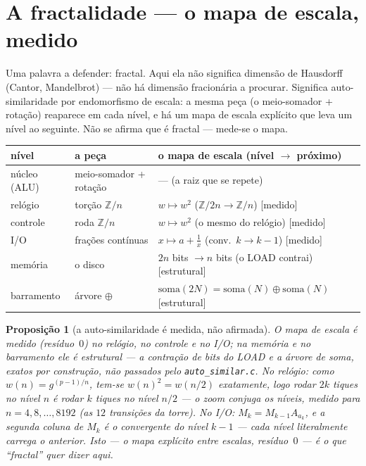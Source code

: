 \documentclass[11pt,a4paper]{article}
\newtheorem{proposicao}{Proposição}
\begin{document}
\section{A fractalidade --- o mapa de escala, medido}

Uma palavra a defender: fractal. Aqui ela não significa dimensão de Hausdorff (Cantor, Mandelbrot)
--- não há dimensão fracionária a procurar. Significa auto-similaridade por endomorfismo de escala:
a mesma peça (o meio-somador + rotação) reaparece em cada nível, e há um mapa de escala explícito
que leva um nível ao seguinte. Não se afirma que é fractal --- mede-se o mapa.

\begin{center}
\begin{tabular}{@{}lll@{}}
\toprule
nível & a peça & o mapa de escala (nível $\to$ próximo) \\
\midrule
núcleo (ALU) & meio-somador + rotação & --- (a raiz que se repete) \\
relógio & torção $\mathbb{Z}/n$ & $w\mapsto w^{2}$ ($\mathbb{Z}/2n\to\mathbb{Z}/n$) [medido] \\
controle & roda $\mathbb{Z}/n$ & $w\mapsto w^{2}$ (o mesmo do relógio) [medido] \\
I/O & frações contínuas & $x\mapsto a+\frac{1}{x}$ (conv.\ $k\to k-1$) [medido] \\
memória & o disco & $2n$ bits $\to n$ bits (o LOAD contrai) [estrutural] \\
barramento & árvore $\oplus$ & $\mathrm{soma}(2N)=\mathrm{soma}(N)\oplus\mathrm{soma}(N)$ [estrutural] \\
\bottomrule
\end{tabular}
\end{center}

\begin{proposicao}[a auto-similaridade é medida, não afirmada]
O mapa de escala é medido (resíduo~$0$) no relógio, no controle e no I/O; na memória e no barramento
ele é estrutural --- a contração de bits do LOAD e a árvore de soma, exatos por construção,
não passados pelo \texttt{auto\_similar.c}. No relógio: como $w(n)=g^{(p-1)/n}$, tem-se
$w(n)^{2}=w(n/2)$ exatamente, logo rodar $2k$ tiques no nível $n$ é rodar $k$ tiques no nível $n/2$ ---
o zoom conjuga os níveis, medido para $n=4,8,\ldots,8192$ (as $12$ transições da torre).
No I/O: $M_{k}=M_{k-1}A_{a_{k}}$, e a segunda coluna de $M_{k}$ é o convergente do nível $k-1$ ---
cada nível literalmente carrega o anterior. Isto --- o mapa explícito entre escalas, resíduo~$0$ ---
é o que ``fractal'' quer dizer aqui.
\end{proposicao}
\end{document}

